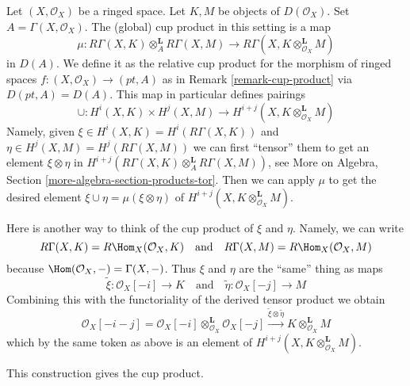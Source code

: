 \noindent
Let $(X, \mathcal{O}_X)$ be a ringed space. Let $K, M$ be objects
of $D(\mathcal{O}_X)$. Set $A = \Gamma(X, \mathcal{O}_X)$.
The (global) cup product in this setting is a map
$$
\mu :
R\Gamma(X, K) \otimes_A^\mathbf{L} R\Gamma(X, M)
\longrightarrow
R\Gamma(X, K \otimes_{\mathcal{O}_X}^\mathbf{L} M)
$$
in $D(A)$. We define it as the relative cup product for the
morphism of ringed spaces $f : (X, \mathcal{O}_X) \to (pt, A)$
as in Remark \ref{remark-cup-product} via $D(pt, A) = D(A)$.
This map in particular defines pairings
$$
\cup :
H^i(X, K) \times H^j(X, M)
\longrightarrow
H^{i + j}(X, K \otimes_{\mathcal{O}_X}^\mathbf{L} M)
$$
Namely, given $\xi \in H^i(X, K) = H^i(R\Gamma(X, K))$ and
$\eta \in H^j(X, M) = H^j(R\Gamma(X, M))$ we can
first ``tensor'' them to get an element $\xi \otimes \eta$ in
$H^{i + j}(R\Gamma(X, K) \otimes_A^\mathbf{L} R\Gamma(X, M))$, see
More on Algebra, Section \ref{more-algebra-section-products-tor}.
Then we can apply $\mu$ to get the desired element
$\xi \cup \eta = \mu(\xi \otimes \eta)$
of $H^{i + j}(X, K \otimes_{\mathcal{O}_X}^\mathbf{L} M)$.

\medskip\noindent
Here is another way to think of the cup product of $\xi$ and $\eta$.
Namely, we can write
$$
R\Gamma(X, K) = R\Hom_X(\mathcal{O}_X, K)
\quad\text{and}\quad
R\Gamma(X, M) = R\Hom_X(\mathcal{O}_X, M)
$$
because $\Hom(\mathcal{O}_X, -) = \Gamma(X, -)$.
Thus $\xi$ and $\eta$ are the ``same'' thing as maps
$$
\tilde \xi : \mathcal{O}_X[-i] \to K
\quad\text{and}\quad
\tilde \eta : \mathcal{O}_X[-j] \to M
$$
Combining this with the functoriality of the derived tensor product
we obtain
$$
\mathcal{O}_X[-i - j] =
\mathcal{O}_X[-i] \otimes_{\mathcal{O}_X}^\mathbf{L} \mathcal{O}_X[-j]
\xrightarrow{\tilde \xi \otimes \tilde \eta}
K \otimes_{\mathcal{O}_X}^\mathbf{L} M
$$
which by the same token as above is an element of
$H^{i + j}(X, K \otimes_{\mathcal{O}_X}^\mathbf{L} M)$.

\begin{lemma}
\label{lemma-second-cup-equals-first}
This construction gives the cup product.
\end{lemma}

